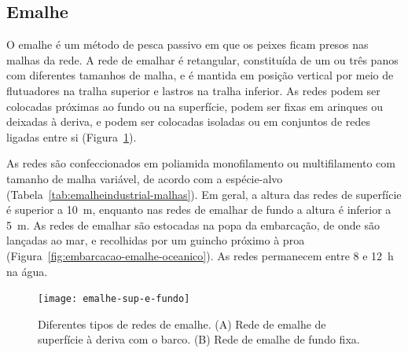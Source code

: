 \documentclass[a4paper,11pt,twoside,showtrims,onecolumn,openright,final]{memoir}
\begin{document}

\subsection*{Emalhe}

O emalhe é um método de pesca passivo em que os peixes ficam presos nas 
malhas da rede. A rede de emalhar é retangular, constituída de um 
ou três panos com diferentes tamanhos de malha, e é mantida 
em posição vertical por meio de flutuadores na tralha 
superior e lastros na tralha inferior. As redes podem ser colocadas próximas 
ao fundo ou na superfície, podem ser fixas em arinques ou deixadas à deriva, 
e podem ser colocadas isoladas ou em conjuntos de redes ligadas entre si (Figura~\ref{fig:redes-emalhar}).

As redes são confeccionados em poliamida monofilamento ou multifilamento 
com tamanho de malha variável, de acordo com a espécie-alvo (Tabela~\ref{tab:emalheindustrial-malhas}).
Em geral, a altura das redes de superfície é superior a 10~m, enquanto nas
redes de emalhar de fundo a altura é inferior a 5~m. 
As redes de emalhar são estocadas na popa da embarcação, de onde são lançadas ao mar, 
e recolhidas por um guincho próximo à proa (Figura~\ref{fig:embarcacao-emalhe-oceanico}).
As redes permanecem entre 8 e 12~h na água.




\begin{figure}
\begin{center}
\texttt{[image: emalhe-sup-e-fundo]}
\end{center}
\caption[Diferentes tipos de redes de emalhe.]
        {Diferentes tipos de redes de emalhe. 
	 (A) Rede de emalhe de superfície à deriva com o barco. 
	 (B) Rede de emalhe de fundo fixa.}
\label{fig:redes-emalhar}
\end{figure}


\end{document}
